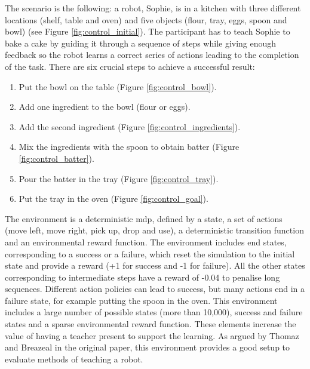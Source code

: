 The scenario is the following: a robot, Sophie, is in a kitchen with three different locations (shelf, table and oven) and five objects (flour, tray, eggs, spoon and bowl) (see Figure \ref{fig:control_initial}). The participant has to teach Sophie to bake a cake by guiding it through a sequence of steps while giving enough feedback so the robot learns a correct series of actions leading to the completion of the task. There are six crucial steps to achieve a successful result:

\begin{enumerate}
	\item Put the bowl on the table (Figure \ref{fig:control_bowl}).
	\item Add one ingredient to the bowl (flour or eggs).
	\item Add the second ingredient (Figure \ref{fig:control_ingredients}).
	\item Mix the ingredients with the spoon to obtain batter (Figure \ref{fig:control_batter}).
	\item Pour the batter in the tray (Figure \ref{fig:control_tray}).
	\item Put the tray in the oven (Figure \ref{fig:control_goal}).
\end{enumerate}

The environment is a deterministic \gls{mdp}, defined by a state, a set of actions (move left, move right, pick up, drop and use), a deterministic transition function and an environmental reward function. The environment includes end states, corresponding to a success or a failure, which reset the simulation to the initial state and provide a reward (+1 for success and -1 for failure). All the other states corresponding to intermediate steps have a reward of -0.04 to penalise long sequences. Different action policies can lead to success, but many actions end in a failure state, for example putting the spoon in the oven. This environment includes a large number of possible states (more than 10,000), success and failure states and a sparse environmental reward function. These elements increase the value of having a teacher present to support the learning. As argued by Thomaz and Breazeal in the original paper, this environment provides a good setup to evaluate methods of teaching a robot.

